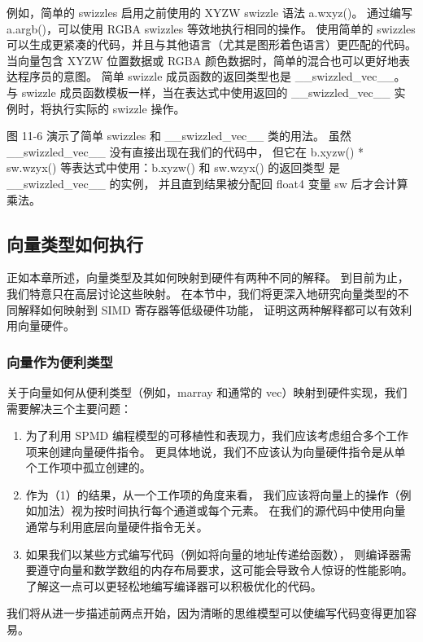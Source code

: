 例如，简单的 swizzles 启用之前使用的 XYZW swizzle 语法 a.wxyz()。 
通过编写 a.argb()，可以使用 RGBA swizzles 等效地执行相同的操作。 
使用简单的 swizzles 可以生成更紧凑的代码，并且与其他语言（尤其是图形着色语言）更匹配的代码。 
当向量包含 XYZW 位置数据或 RGBA 颜色数据时，简单的混合也可以更好地表达程序员的意图。 
简单 swizzle 成员函数的返回类型也是 \_\_swizzled\_vec\_\_。 
与 swizzle 成员函数模板一样，当在表达式中使用返回的 \_\_swizzled\_vec\_\_ 实例时，将执行实际的 swizzle 操作。

图 11-6 演示了简单 swizzles 和 \_\_swizzled\_vec\_\_ 类的用法。 
虽然 \_\_swizzled\_vec\_\_ 没有直接出现在我们的代码中，
但它在 b.xyzw() * sw.wzyx() 等表达式中使用：b.xyzw() 和 sw.wzyx() 的返回类型
是 \_\_swizzled\_vec\_\_ 的实例， 并且直到结果被分配回 float4 变量 sw 后才会计算乘法。

\subsection{向量类型如何执行}
正如本章所述，向量类型及其如何映射到硬件有两种不同的解释。 到目前为止，我们特意只在高层讨论这些映射。 
在本节中，我们将更深入地研究向量类型的不同解释如何映射到 SIMD 寄存器等低级硬件功能，
证明这两种解释都可以有效利用向量硬件。

\subsubsection{向量作为便利类型}
关于向量如何从便利类型（例如，marray 和通常的 vec）映射到硬件实现，我们需要解决三个主要问题：

\begin{enumerate}
	\item 为了利用 SPMD 编程模型的可移植性和表现力，我们应该考虑组合多个工作项来创建向量硬件指令。 
	更具体地说，我们不应该认为向量硬件指令是从单个工作项中孤立创建的。

	\item 作为（1）的结果，从一个工作项的角度来看，
	我们应该将向量上的操作（例如加法）视为按时间执行每个通道或每个元素。 
	在我们的源代码中使用向量通常与利用底层向量硬件指令无关。

	\item 如果我们以某些方式编写代码（例如将向量的地址传递给函数），
	则编译器需要遵守向量和数学数组的内存布局要求，这可能会导致令人惊讶的性能影响。 
	了解这一点可以更轻松地编写编译器可以积极优化的代码。
\end{enumerate}

我们将从进一步描述前两点开始，因为清晰的思维模型可以使编写代码变得更加容易。

